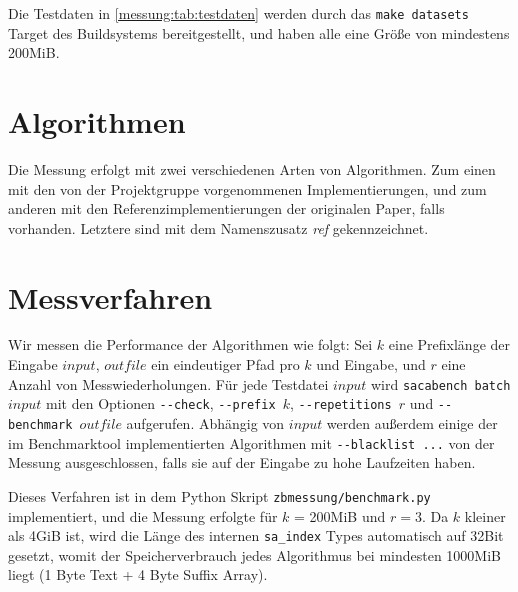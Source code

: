 Die Testdaten in \cref{messung:tab:testdaten} werden durch das \texttt{make datasets} Target des Buildsystems bereitgestellt, und haben alle eine Größe von mindestens 200MiB.


\section{Algorithmen}

Die Messung erfolgt mit zwei verschiedenen Arten von Algorithmen. Zum einen mit den von der Projektgruppe vorgenommenen Implementierungen, und zum anderen mit den Referenzimplementierungen der originalen Paper, falls vorhanden. Letztere sind mit dem Namenszusatz \textit{ref} gekennzeichnet.

\section{Messverfahren}

Wir messen die Performance der Algorithmen wie folgt: Sei $k$ eine Prefixlänge der Eingabe $input$, $outfile$ ein eindeutiger Pfad pro $k$ und Eingabe, und $r$ eine Anzahl von Messwiederholungen. Für jede Testdatei $input$ wird \texttt{sacabench batch $input$} mit den Optionen \texttt{-{}-check}, \texttt{-{}-prefix $k$}, \texttt{-{}-repetitions $r$} und \texttt{-{}-benchmark $outfile$} aufgerufen. Abhängig von $input$ werden außerdem einige der im Benchmarktool implementierten Algorithmen mit \texttt{-{}-blacklist ...} von der Messung ausgeschlossen, falls sie auf der Eingabe zu hohe Laufzeiten haben.


Dieses Verfahren ist in dem Python Skript \texttt{zbmessung/benchmark.py} implementiert, und die Messung erfolgte für $k$ = 200MiB und $r = 3$. Da $k$ kleiner als 4GiB ist, wird die Länge des internen \texttt{sa\_index} Types automatisch auf 32Bit gesetzt, womit der Speicherverbrauch jedes Algorithmus bei mindesten 1000MiB liegt (1 Byte Text + 4 Byte Suffix Array).


